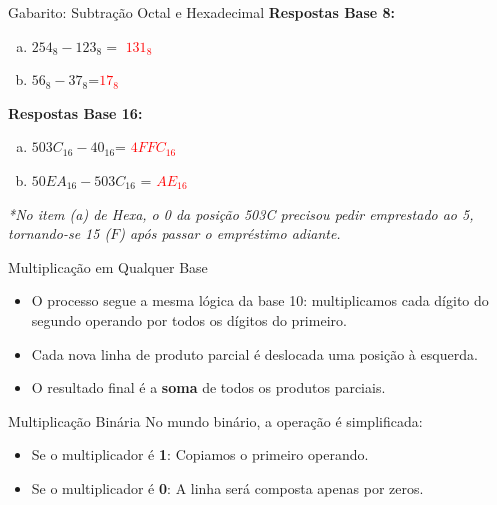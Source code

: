 \begin{frame}{Gabarito: Subtração Octal e Hexadecimal}
    \textbf{Respostas Base 8:}
    \begin{enumerate}[a)]
        \item $254_8 - 123_8 =$  \textcolor{red}{$131_8$}
        \item $56_8 - 37_8  $=\textcolor{red}{$17_8$}
    \end{enumerate}

    \vspace{0.8cm}

    \textbf{Respostas Base 16:}
    \begin{enumerate}[a)]
        \item $503C_{16} - 40_{16} $= \textcolor{red}{$4FFC_{16}$}
        \item $50EA_{16} - 503C_{16} $  = \textcolor{red}{$AE_{16}$}
    \end{enumerate}

    \vspace{0.3cm}
    \footnotesize \textit{*No item (a) de Hexa, o 0 da posição 503C precisou pedir emprestado ao 5, tornando-se 15 ($F$) após passar o empréstimo adiante.}
\end{frame}

\begin{frame}{Multiplicação em Qualquer Base}
    \begin{itemize}
        \item O processo segue a mesma lógica da base 10: multiplicamos cada dígito do segundo operando por todos os dígitos do primeiro.
        \item Cada nova linha de produto parcial é deslocada uma posição à esquerda.
        \item O resultado final é a \textbf{soma} de todos os produtos parciais.
    \end{itemize}

    \begin{block}{Multiplicação Binária}
        No mundo binário, a operação é simplificada:
        \begin{itemize}
            \item Se o multiplicador é \textbf{1}: Copiamos o primeiro operando.
            \item Se o multiplicador é \textbf{0}: A linha será composta apenas por zeros.
        \end{itemize}
    \end{block}
\end{frame}

